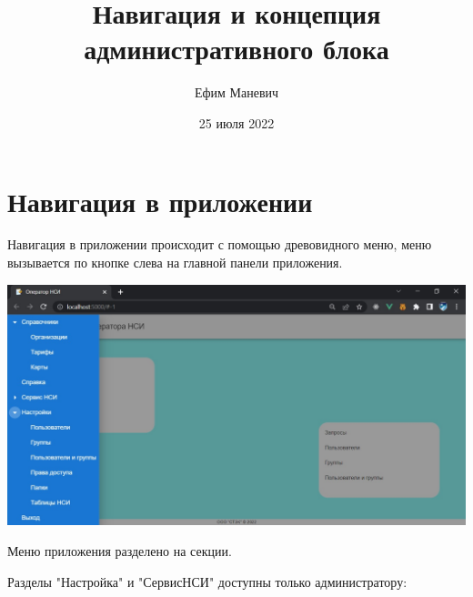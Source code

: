 \documentclass[12pt, a4paper]{article}
\title{Навигация и концепция административного блока}
\author{Ефим Маневич}
\date{25 июля 2022}
\begin{document}
\maketitle

\section{Навигация в приложении}

Навигация в приложении происходит с помощью древовидного меню, меню вызывается по кнопке слева на
главной панели приложения. 

\begin{center}
    \includegraphics [width=\textwidth] {p1.png}
\end{center}

Меню приложения разделено на секции. 

Разделы "Настройка" и "СервисНСИ" доступны только администратору:
\end{document}
